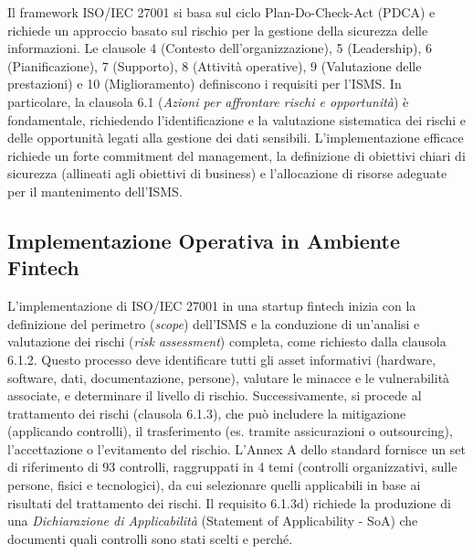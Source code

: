 Il framework ISO/IEC 27001 si basa sul ciclo Plan-Do-Check-Act (PDCA) e richiede un approccio basato sul rischio per la gestione della sicurezza delle informazioni. Le clausole 4 (Contesto dell'organizzazione), 5 (Leadership), 6 (Pianificazione), 7 (Supporto), 8 (Attività operative), 9 (Valutazione delle prestazioni) e 10 (Miglioramento) definiscono i requisiti per l'ISMS. In particolare, la clausola 6.1 (\textit{Azioni per affrontare rischi e opportunità}) è fondamentale, richiedendo l'identificazione e la valutazione sistematica dei rischi e delle opportunità legati alla gestione dei dati sensibili. L'implementazione efficace richiede un forte commitment del management, la definizione di obiettivi chiari di sicurezza (allineati agli obiettivi di business) e l'allocazione di risorse adeguate per il mantenimento dell'ISMS.

\subsection{Implementazione Operativa in Ambiente Fintech}
L'implementazione di ISO/IEC 27001 in una startup fintech inizia con la definizione del perimetro (\textit{scope}) dell'ISMS e la conduzione di un'analisi e valutazione dei rischi (\textit{risk assessment}) completa, come richiesto dalla clausola 6.1.2. Questo processo deve identificare tutti gli asset informativi (hardware, software, dati, documentazione, persone), valutare le minacce e le vulnerabilità associate, e determinare il livello di rischio. Successivamente, si procede al trattamento dei rischi (clausola 6.1.3), che può includere la mitigazione (applicando controlli), il trasferimento (es. tramite assicurazioni o outsourcing), l'accettazione o l'evitamento del rischio. L'Annex A dello standard fornisce un set di riferimento di 93 controlli, raggruppati in 4 temi (controlli organizzativi, sulle persone, fisici e tecnologici), da cui selezionare quelli applicabili in base ai risultati del trattamento dei rischi. Il requisito 6.1.3d) richiede la produzione di una \textit{Dichiarazione di Applicabilità} (Statement of Applicability - SoA) che documenti quali controlli sono stati scelti e perché.

